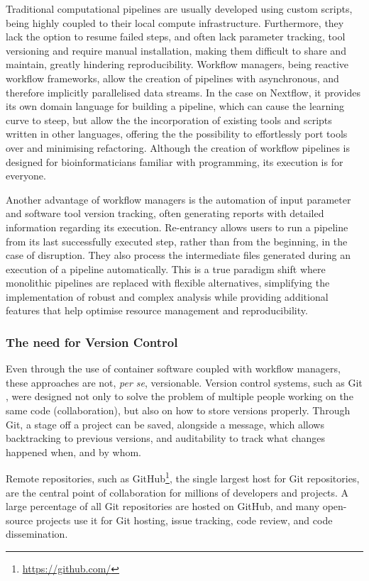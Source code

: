 Traditional computational pipelines are usually developed using custom scripts, being highly coupled to their local compute infrastructure. Furthermore, they lack the option to resume failed steps, and often lack parameter tracking, tool versioning and require manual installation, making them difficult to share and maintain, greatly hindering reproducibility. Workflow managers, being reactive workflow frameworks, allow the creation of pipelines with asynchronous, and therefore implicitly parallelised data streams. In the case on Nextflow, it provides its own domain language for building a pipeline, which can cause the learning curve to steep, but allow the the incorporation of existing tools and scripts written in other languages, offering the the possibility to effortlessly port tools over and minimising refactoring. Although the creation of workflow pipelines is designed for bioinformaticians familiar with programming, its execution is for everyone. 

Another advantage of workflow managers is the automation of input parameter and software tool version tracking, often generating reports with detailed information regarding its execution. Re-entrancy allows users to run a pipeline from its last successfully executed step, rather than from the beginning, in the case of disruption. They also process the intermediate files generated during an execution of a pipeline automatically. This is a true paradigm shift where monolithic pipelines are replaced with flexible alternatives, simplifying the implementation of robust and complex analysis while providing additional features that help optimise resource management and reproducibility.  

\subsubsection{The need for Version Control}

Even through the use of container software coupled with workflow managers, these approaches are not, \textit{per se}, versionable. Version control systems, such as Git \citep{chacon2014pro}, were designed not only to solve the problem of multiple people working on the same code (collaboration), but also on how to store versions properly. Through Git, a stage off a project can be saved, alongside a message, which allows backtracking to previous versions, and auditability to track what changes happened when, and by whom. 

Remote repositories, such as GitHub\footnote{\url{https://github.com/}}, the single largest host for Git repositories, are the central point of collaboration for millions of developers and projects. A large percentage of all Git repositories are hosted on GitHub, and many open-source projects use it for Git hosting, issue tracking, code review, and code dissemination. 

